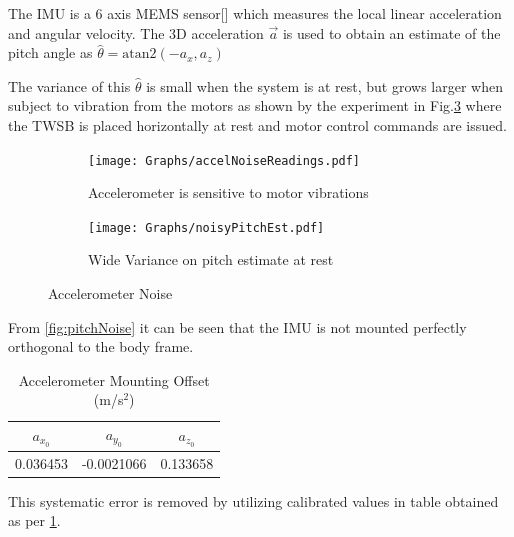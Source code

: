         The IMU is a 6 axis MEMS sensor[] which measures the local linear acceleration 
        and angular velocity.
        The 3D acceleration $\vec{a}$ is used to obtain an 
        estimate of the pitch angle as    $\hat{\theta} = \mathrm{atan2}\left(-a_x ,a_z \right)$

        The variance of this $\hat{\theta}$ is small when the system is at rest, but grows larger when subject to vibration from the motors
        as shown by the experiment in Fig.\ref{fig:accelNoise} where the TWSB is placed horizontally at rest and motor control commands are issued. 
        \begin{figure}[H]
            \centering
            \begin{subfigure}[b]{0.5\textwidth}

                \texttt{[image: Graphs/accelNoiseReadings.pdf]}
                \caption{Accelerometer is sensitive to motor vibrations}
                \label{fig:accelRaw}
                
            \end{subfigure}
            \hfill
            \begin{subfigure}[b]{0.45\textwidth}
                \texttt{[image: Graphs/noisyPitchEst.pdf]}
                \caption{Wide Variance on pitch estimate at rest}
                \label{fig:pitchNoise}
            \label{fig:accelNoise}
            \end{subfigure}
            \caption{Accelerometer Noise}   
        \end{figure}

        From \ref{fig:pitchNoise} it can be seen that the IMU is not mounted perfectly orthogonal to the body frame. 
        \begin{table}[H]
            \centering
            \begin{tabular}{c c c} 
                \toprule
                $a_{x_0}$ & $a_{y_0}$ & $a_{z_0}$ \\
                \midrule
                0.036453 & -0.0021066 & 0.133658 \\
                \bottomrule

            \end{tabular}
            \caption{Accelerometer Mounting Offset (m/s$^{2}$)}
            \label{tab:accelOffset}
        \end{table}
        This systematic error is removed by utilizing calibrated values in table obtained as per \ref{tab:accelOffset}.
        

